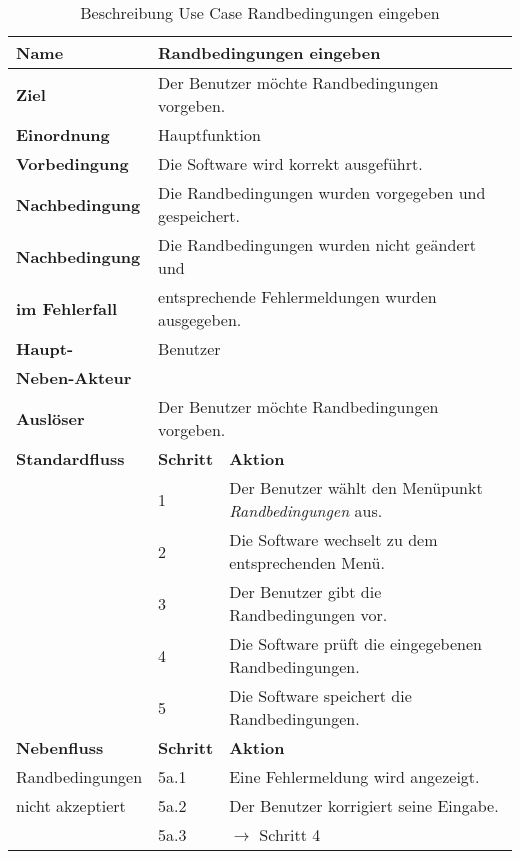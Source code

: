 \begin{table} [H]
	\centering
	\begin{tabular}{|l|l|l|}
		\hline
		\textbf{Name} 			& \multicolumn{2}{|l|}{Randbedingungen eingeben}  \\
		\hline
		\textbf{Ziel} 			& \multicolumn{2}{|l|}{Der Benutzer möchte Randbedingungen vorgeben. }\\ 
		\hline
		\textbf{Einordnung}		& \multicolumn{2}{|l|}{Hauptfunktion}\\
		\hline
		\textbf{Vorbedingung}	& \multicolumn{2}{|l|}{Die Software wird korrekt ausgeführt.} \\
		\hline
		\textbf{Nachbedingung}	& \multicolumn{2}{|l|}{Die Randbedingungen wurden vorgegeben und gespeichert.}\\
		\hline
		\textbf{Nachbedingung} 	& \multicolumn{2}{|l|}{Die Randbedingungen wurden nicht geändert und}\\
		\textbf{im Fehlerfall}	& \multicolumn{2}{|l|}{entsprechende Fehlermeldungen wurden ausgegeben.}\\
		\hline
		\textbf{Haupt-} 			& \multicolumn{2}{|l|}{Benutzer}\\
		\textbf{Neben-Akteur}	& \multicolumn{2}{|l|}{	}			\\
		\hline
		\textbf{Auslöser} 		& \multicolumn{2}{|l|}{Der Benutzer möchte Randbedingungen vorgeben.} \\
		\hline 
		\textbf{Standardfluss} & \textbf{Schritt} & \textbf{Aktion} \\
		\hline
		&	1	& Der Benutzer wählt den Menüpunkt \emph{Randbedingungen} aus. \\
		\cline{2-3}
		&	2	& Die Software wechselt zu dem entsprechenden Menü.\\
		\cline{2-3}
		&	3	& Der Benutzer gibt die Randbedingungen vor.\\
		\cline{2-3}
		&	4	& Die Software prüft die eingegebenen Randbedingungen.\\
		\cline{2-3}
		&	5	& Die Software speichert die Randbedingungen.\\
		\hline
		\textbf{Nebenfluss} & \textbf{Schritt} & \textbf{Aktion}\\
		\hline
		Randbedingungen  & 5a.1 & Eine Fehlermeldung wird angezeigt.\\
		\cline{2-3}
		nicht akzeptiert 	& 5a.2	& Der Benutzer korrigiert seine Eingabe.\\
		\cline{2-3}
					& 5a.3 	& $\rightarrow$ Schritt 4\\
		\hline
	\end{tabular}
	\caption{Beschreibung Use Case Randbedingungen eingeben}
	\label{Beschreibung Use Case Randbedingungen_eingeben}
\end{table}

